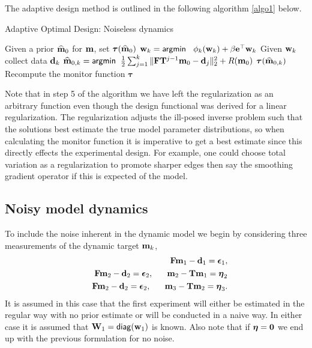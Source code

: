 \documentclass[english]{siamltex}
\newcommand{\bfF}	{{\bf{F}}}
\newcommand{\bfI}	{{\bf{I}}}
\newcommand{\bfT}	{{\bf{T}}}
\newcommand{\bfW}	{{\bf{W}}}
\newcommand{\bfd}	{{\bf{d}}}
\newcommand{\bfe}	{{\bf{e}}}
\newcommand{\bfm}	{{\bf{m}}}
\newcommand{\bfw}	{{\bf{w}}}
\newcommand{\hf}        {{\frac 12}}
\newcommand{\bfepsilon} {{\boldsymbol \epsilon}}
\newcommand{\bfeta}     {{\boldsymbol \eta}}
\newcommand{\bftau}      {{\boldsymbol \tau}}
\newcommand{\bfmhat}    {{\widehat{\bfm}}}
\newcommand {\zero}  { {\bf 0} }
\renewcommand{\hf}		 {\frac12}
\renewcommand{\bfmhat}	{\widehat{\bf m}}
\begin{document}
{\bigskip
The adaptive design method is outlined in the following algorithm \ref{algo1} below.
\begin{algorithm}
\caption{Adaptive Optimal Design: Noiseless dynamics}\label{algo1}
\begin{algorithmic}[1]
\State Given a prior $\bfmhat_{0}$  for $\bfm$, set $\bftau(\bfmhat_0)$
\Comment{if there is no prior, $\bftau = \bfI$}
\State $\bfw_{k} = {\sf argmin }\;\;\ \phi_k(\bfw_k) + \beta\bfe^{\top}\bfw_k$  
\State Given $\bfw_k$ collect data $\bfd_k$
%
\State $\bfmhat_{0,k} ={\sf argmin } \;\; \hf  \sum_{j=1}^{k}\| \bfF\bfT^{j-1}\bfm_0 - \bfd_j \|^2_2 + R(\bfm_0)$
\Comment {re-estimate $\bfm_0$ }
\State $\bftau(\bfmhat_{0,k})$
\Comment Recompute the monitor function $\bftau$
\EndFor
\end{algorithmic}
\end{algorithm}
Note that in step 5 of the algorithm we have left the regularization as an arbitrary function even though the design functional was derived for a linear regularization. The regularization adjusts the ill-posed inverse problem such that the solutions best estimate the true model parameter distributions, so when calculating the monitor function it is imperative to get a best estimate since this directly effects the experimental design. For example, one could choose total variation as a regularization to promote sharper edges then say the smoothing gradient operator if this is expected of the model. 
\subsection{Noisy model dynamics}
\label{Kalman}
To include the noise inherent in the dynamic model we begin by  considering three measurements of the dynamic target $\bfm_k$,
\begin{eqnarray*}
\label{eq:noisy}
&&\bfF\bfm_{1} - \bfd_1 = \bfepsilon_1,\\
&&\bfF\bfm_{2} - \bfd_2 = \bfepsilon_2, \;\;\;\;\;\; \bfm_2 -\bfT\bfm_1 = \bfeta_2 \\
&&\bfF\bfm_{2} - \bfd_2 = \bfepsilon_2, \;\;\;\;\;\; \bfm_3 -\bfT\bfm_2 = \bfeta_3.
\end{eqnarray*} 
It is assumed in this case that the first experiment will either be estimated in the regular way with no prior estimate or will be conducted in a naive way. In either case it is assumed that $\bfW_1 = {\sf diag}(\bfw_1)$ is known. Also note that if $\bfeta = \zero$ we end up with the previous formulation for no noise. 

}
\end{document}
